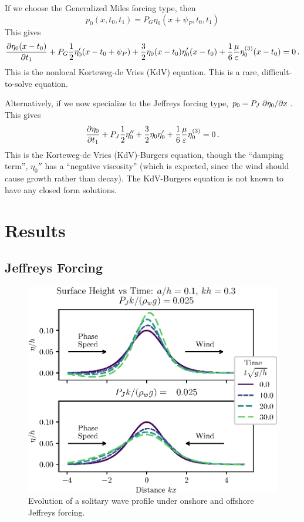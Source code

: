 \documentclass{jfm}
\renewcommand*{\epsilon}{\varepsilon}
\begin{document}
If we choose the Generalized Miles forcing type, then
\[
  p_0(x,t_0,t_1) = P_G \eta_0(x+\psi_P,t_0,t_1)
\]
This gives
\begin{equation}
  \pdv{\eta_0(x-t_0)}{t_1} + P_G \frac{1}{2} \eta_0'(x-t_0+\psi_P) +
  \frac{3}{2} \eta_0(x-t_0) \eta_0'(x-t_0) + \frac{1}{6}
  \frac{\mu}{\epsilon} \eta_0^{(3)}(x-t_0) = 0 \,.
  \label{eq:kdv_burgers_gen}
\end{equation}
This is the nonlocal Korteweg-de Vries (KdV) equation.
This is a rare, difficult-to-solve equation.

Alternatively, if we now specialize to the Jeffreys forcing type, $p_0 = P_J
\pdv*{\eta_0}{x}$.
This gives
\begin{equation}
   \pdv{\eta_0}{t_1} + P_J \frac{1}{2} \eta_0'' + \frac{3}{2} \eta_0
     \eta_0' + \frac{1}{6} \frac{\mu}{\epsilon} \eta_0^{(3)} = 0 \,.
  \label{eq:kdv_burgers}
\end{equation}
This is the Korteweg-de Vries (KdV)-Burgers equation, though the
``damping term'', $\eta_0''$ has a ``negative viscosity'' (which is
expected, since the wind should cause growth rather than decay).
The KdV-Burgers equation is not known to have any closed form solutions.

\section{Results}

\subsection{Jeffreys Forcing}
\begin{figure}
  \centering
  \includegraphics{Snapshots-Positive-Negative.eps}
  \caption{
    Evolution of a solitary wave profile under onshore and offshore Jeffreys
    forcing.
  }
\end{figure}
\end{document}
